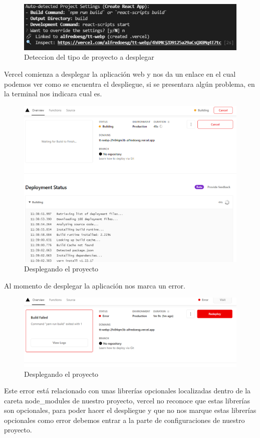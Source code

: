 \documentclass[12pt, a4paper, titlepage]{article}
\begin{document}
	\begin{figure}[H]
		\includegraphics[width=12cm]{./Imagenes/Despliegue/Deteccion.png}
		\centering 
		\caption{Deteccion del tipo de proyecto a desplegar}
	\end{figure}
	Vercel comienza a desplegar la aplicación web y nos da un enlace en el cual podemos ver como se encuentra el despliegue, si se presentara algún problema, en la terminal nos indicara cual es.
	\begin{figure}[H]
		\includegraphics[width=12cm]{./Imagenes/Despliegue/Desplegando.png}
		\centering 
		\caption{Desplegando el proyecto}
	\end{figure}
	Al momento de desplegar la aplicación nos marca un error.
	\begin{figure}[H]
		\includegraphics[width=12cm]{./Imagenes/Despliegue/Error.png}
		\centering 
		\caption{Desplegando el proyecto}
	\end{figure}
	Este error está relacionado con unas librerías opcionales localizadas dentro de la careta node\_modules de nuestro proyecto, vercel no reconoce que estas librerías son opcionales, para poder hacer el despliegue y que no nos marque estas librerías opcionales como error debemos entrar a la parte de configuraciones de nuestro proyecto.	
\end{document}
